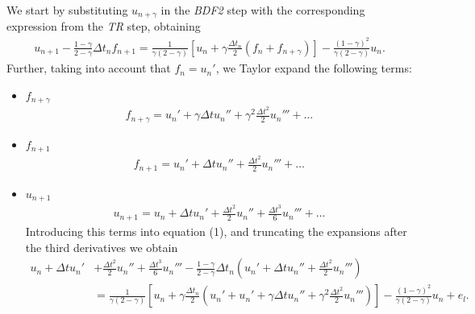 \begin{questions}

\begin{solution}
We start by substituting $u_{n+\gamma}$ in the \textsl{BDF2} step with the corresponding expression from the \textsl{TR} step, obtaining
\begin{align}
u_{n+1}-\frac{1-\gamma}{2-\gamma}\Delta t_nf_{n+1}=\frac{1}{\gamma(2-\gamma)}\left[u_n+\gamma\frac{\Delta t_n}{2}\left(f_n+f_{n+\gamma}\right)\right]-\frac{(1-\gamma)^2}{\gamma(2-\gamma)}u_n.
\end{align}
Further, taking into account that $f_n=u_n'$, we Taylor expand the following terms:
\begin{itemize}
\item $f_{n+\gamma}$
\begin{align*}
f_{n+\gamma}=u_n'+\gamma\Delta tu_n''+\gamma^2\frac{\Delta t^2}{2} u_n'''+\dots
\end{align*}
\item $f_{n+1}$
\begin{align*}
f_{n+1}=u_n'+\Delta tu_n''+\frac{\Delta t^2}{2} u_n'''+\dots
\end{align*}
\item $u_{n+1}$
\begin{align*}
u_{n+1}=u_n+\Delta tu_n'+\frac{\Delta t^2}{2} u_n''+\frac{\Delta t^3}{6} u_n'''+\dots
\end{align*}
Introducing this terms into equation (1), and truncating the expansions after the third derivatives we obtain
\begin{align*}
u_n+\Delta tu_n'&+\frac{\Delta t^2}{2} u_n''+\frac{\Delta t^3}{6} u_n'''-\frac{1-\gamma}{2-\gamma}\Delta t_n\left(u_n'+\Delta tu_n''+\frac{\Delta t^2}{2} u_n'''\right)\\
&=\frac{1}{\gamma(2-\gamma)}\left[u_n+\gamma\frac{\Delta t_n}{2}\left(u_n'+u_n'+\gamma\Delta tu_n''+\gamma^2\frac{\Delta t^2}{2} u_n'''\right)\right]-\frac{(1-\gamma)^2}{\gamma(2-\gamma)}u_n+e_l.

\end{align*}
\end{itemize}
\end{solution}
\end{questions}
